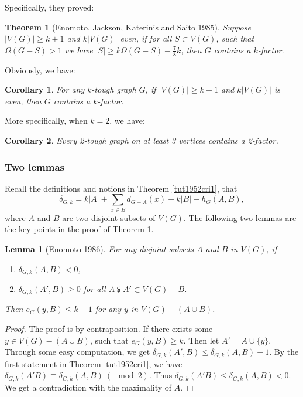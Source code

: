 \documentclass[12pt]{report}
\newtheorem{theorem}{Theorem}
\newtheorem{lemma}{Lemma}
\newtheorem{corollary}{Corollary}
\begin{document}
Specifically, they proved:

\begin{theorem}[Enomoto, Jackson, Katerinis and Saito 1985]\label{kttokf19851}
Suppose $|V(G)|\ge k+1$ and $k|V(G)|$ even, if for all $S\subset V(G)$, such that $\Omega(G-S)>1$ we have $|S|\ge k\Omega(G-S)-\frac{7}{8}k$, then $G$ contains a $k$-factor.
\end{theorem}

Obviously, we have:
\begin{corollary}
For any $k$-tough graph $G$, if $|V(G)|\ge k+1$ and $k|V(G)|$ is even, then $G$ contains a $k$-factor.
\end{corollary}

More specifically, when $k=2$, we have:

\begin{corollary}\label{kttokfejks}
Every 2-tough graph on at least 3 vertices contains a 2-factor.
\end{corollary}




\subsubsection{Two lemmas}
Recall the definitions and notions in Theorem \ref{tut1952cri1}, that $$\delta_{G,k}=k|A|+\sum_{x\in B}d_{G-A}(x)-k|B|-h_G(A,B),$$ where $A$ and $B$ are two disjoint subsets of $V(G)$.
The following two lemmas are the key points in the proof of Theorem \ref{kttokf19851}.
\begin{lemma}[Enomoto 1986]\label{lmbineno86}
For any disjoint subsets $A$ and $B$ in $V(G)$, if
\begin{enumerate}
\item $\delta_{G,k}(A,B)<0$,
\item $\delta_{G,k}(A',B)\ge0$ for all $A\subsetneqq A'\subset V(G)-B$.
\end{enumerate}
Then $e_G(y,B)\le k-1$ for any $y$ in $V(G)-(A\cup B)$.
\end{lemma}
\begin{proof}
The proof is by contraposition.
If there exists some $y\in V(G)-(A\cup B)$, such that $e_G(y,B)\ge k$. Then let $A'=A\cup\{y\}$. Through some easy computation, we get $\delta_{G,k}(A',B)\le\delta_{G,k}(A,B)+1$.
By the first statement in Theorem \ref{tut1952cri1}, we have $\delta_{G,k}(A'B)\equiv\delta_{G,k}(A,B)~(\mod 2)$. Thus $\delta_{G,k}(A'B)\le\delta_{G,k}(A,B)<0$. We get a contradiction with the maximality of $A$.
\end{proof}
\end{document}
